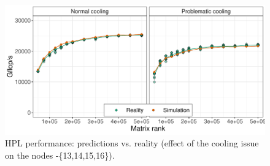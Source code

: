         \begin{figure}[htpb]
            \begin{minipage}{0.8\linewidth}
                \centering
                \includegraphics[width=\linewidth]{img/prediction/validation/temperature/validation_temperature.pdf}
            \end{minipage}%
            \begin{minipage}{0.2\linewidth}
            \end{minipage}
            \caption{HPL performance: predictions vs. reality (effect of the cooling issue on the nodes \dahu-\{13,14,15,16\}).}
            \label{fig:validation_temperature}
        \end{figure}

